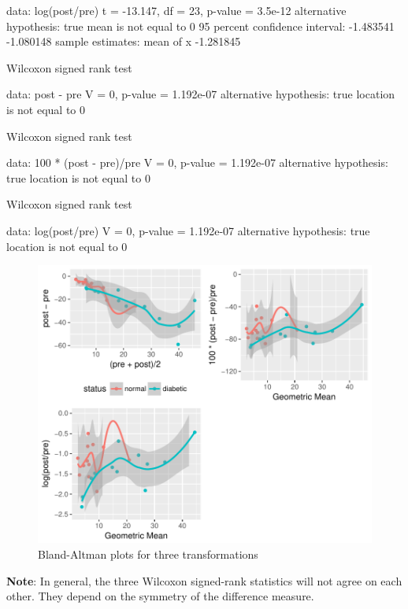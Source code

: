 \begin{Schunk}
\begin{Soutput}
data:  log(post/pre)
t = -13.147, df = 23, p-value = 3.5e-12
alternative hypothesis: true mean is not equal to 0
95 percent confidence interval:
 -1.483541 -1.080148
sample estimates:
mean of x 
-1.281845 


	Wilcoxon signed rank test

data:  post - pre
V = 0, p-value = 1.192e-07
alternative hypothesis: true location is not equal to 0


	Wilcoxon signed rank test

data:  100 * (post - pre)/pre
V = 0, p-value = 1.192e-07
alternative hypothesis: true location is not equal to 0


	Wilcoxon signed rank test

data:  log(post/pre)
V = 0, p-value = 1.192e-07
alternative hypothesis: true location is not equal to 0
\end{Soutput}
\begin{figure}[htbp]

\centerline{\includegraphics{change-analysis-1} }

\caption[Bland-Altman plots for three transformations]{Bland-Altman plots for three transformations}\label{fig:change-analysis}
\end{figure}
\end{Schunk}
\textbf{Note}: In general, the three Wilcoxon signed-rank statistics
will not agree on each other.  They depend on the symmetry of the
difference measure.
\nocite{kai89,tor85how,mar85mod,kro93spu,col00sym}


